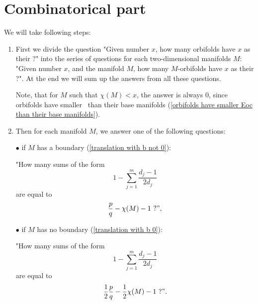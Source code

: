 \section{Combinatorical part}\label{combinatorical part}
We will take following steps:
\begin{enumerate}
\item First we divide the question "Given number $x$, how many orbifolds have $x$ as their \Eoc?" 
into the series of questions 
for each two-dimensional manifolds $M$:
"Given number $x$, and the manifold $M$, how many $M$-orbifolds have $x$ as their \Eoc?". 
At the end we will sum up the answers from all these questions. 

Note, that for $M$ such that $\chi(M) < x$, the answer is always $0$, since 
orbifolds have smaller \Eoc\ than their base manifolds 
(\ref{orbifolds have smaller Eoc than their base manifolds}).
\item Then for each manifold $M$, we answer one of the following questions: 

$\bullet$ if $M$ has a boundary (\ref{translation with b not 0}): 

"How many sums of the form 
\begin{equation}
1-\sum_{j=1}^m \frac{d_j-1}{2d_j} 
\end{equation}
are equal to 
\begin{equation}
\frac{p}{q} - \chi(M) - 1 \ ?", 
\end{equation}




$\bullet$ if $M$ has no boundary (\ref{translation with b 0}): 

"How many sums of the form
\begin{equation}
1-\sum_{j=1}^m \frac{d_j-1}{2d_j} 
\end{equation}
are equal to 
\begin{equation}
\frac{1}{2}\frac{p}{q} - \frac{1}{2}\chi(M) -1\ ?".
\end{equation}


\end{enumerate}
